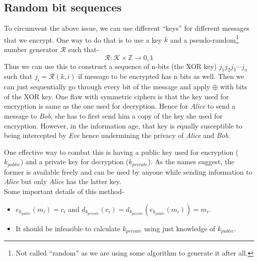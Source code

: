 		\subsection{Random bit sequences}\label{subsec:random}
				To circumvent the above issue, we can use different ``keys'' for different messages that we encrypt. One way to do that is to use a key \(k\) and a pseudo-random\footnote{Not called ``random'' as we are using some algorithm to generate it after all.} number generator \(\mathcal{R}\) such that-
				\[
					\mathcal{R} : \mathcal{K} \times \mathbb{Z} \rightarrow {0,1}
				\]
				Thus we can use this to construct a sequence of n-bits (the XOR key) \(j_1j_2j_3 \cdots j_n\) such that \(j_i = \mathcal{R}(k, i)\) if message to be encrypted has n bits as well. Then we can just sequentially go through every bit of the message and apply \(\oplus\) with bits of the XOR key.
	\label{sec:asym}
		One flaw with symmetric ciphers is that the key used for encryption is same as the one used for decryption. Hence for \emph{Alice} to send a message to \emph{Bob}, she has to first send him a copy of the key she used for encryption. However, in the information age, that key is equally susceptible to being intercepted by \emph{Eve} hence undermining the privacy of \emph{Alice} and \emph{Bob}.\par
		One effective way to combat this is having a public key used for encryption (\(k_{public}\)) and a {private} key for decryption (\(k_{private}\)). As the names suggest, the former is available freely and can be used by anyone while sending information to \emph{Alice} but only \emph{Alice} has the latter key. \\
		Some important details of this method-
		\begin{itemize}
			\item \(e_{k_{public}}(m_i) = c_i\) and \(d_{k_{private}}(c_i)=d_{k_{private}}(e_{k_{public}}(m_i))=m_i\).
			\item It should be infeasible to calculate \(k_{private}\) using just knowledge of \(k_{public}\).
		\end{itemize}



